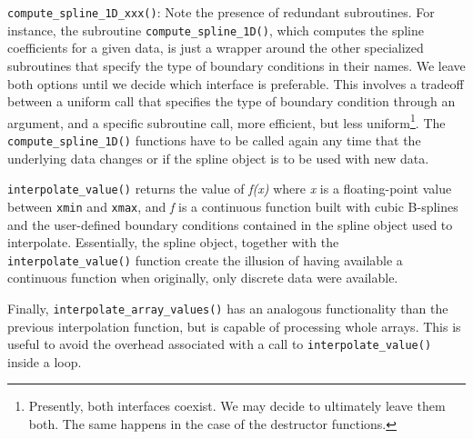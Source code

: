 \documentclass[]{report}   %
\begin{document}
\verb+compute_spline_1D_xxx()+: Note the presence of redundant subroutines. For instance, the subroutine \verb+compute_spline_1D()+, which computes the spline coefficients for a given data, is just a wrapper around the other specialized subroutines that specify the type of boundary conditions in their names. We leave both options until we decide which interface is preferable. This involves a tradeoff between a uniform call that specifies the type of boundary condition through an argument, and a specific subroutine call, more efficient, but less uniform\footnote{Presently, both interfaces coexist. We may decide to ultimately leave them both. The same happens in the case of the destructor functions.}. The \verb+compute_spline_1D()+ functions have to be called again any time that the underlying data changes or if the spline object is to be used with new data. 

\verb+interpolate_value()+ returns the value of \emph{f(x)} where \emph{x} is a floating-point value between \verb+xmin+ and \verb+xmax+, and \emph{f} is a continuous function built with cubic B-splines and the user-defined boundary conditions contained in the spline object used to interpolate. Essentially, the spline object, together with the \verb+interpolate_value()+ function create the illusion of having available a continuous function when originally, only discrete data were available.

Finally, \verb+interpolate_array_values()+ has an analogous functionality than the previous interpolation function, but is capable of processing whole arrays. This is useful to avoid the overhead associated with a call to \verb+interpolate_value()+ inside a loop.
\end{document}
